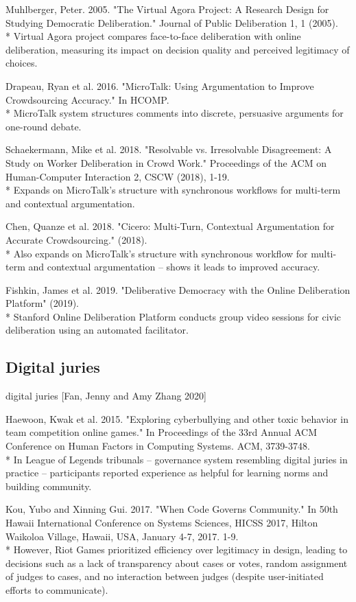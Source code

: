 \documentclass[class=book, crop=false]{standalone}
\begin{document}
Muhlberger, Peter. 2005. "The Virtual Agora Project: A Research Design for Studying Democratic Deliberation." Journal of Public Deliberation 1, 1 (2005).\\
 * Virtual Agora project compares face-to-face deliberation with online deliberation, measuring its impact on decision quality and perceived legitimacy of choices.

Drapeau, Ryan et al. 2016. "MicroTalk: Using Argumentation to Improve Crowdsourcing Accuracy." In HCOMP.\\
 * MicroTalk system structures comments into discrete, persuasive arguments for one-round debate.

Schaekermann, Mike et al. 2018. "Resolvable vs. Irresolvable Disagreement: A Study on Worker Deliberation in Crowd Work." Proceedings of the ACM on Human-Computer Interaction 2, CSCW (2018), 1-19.\\
 * Expands on MicroTalk's structure with synchronous workflows for multi-term and contextual argumentation.

Chen, Quanze et al. 2018. "Cicero: Multi-Turn, Contextual Argumentation for Accurate Crowdsourcing." (2018).\\
 * Also expands on MicroTalk's structure with synchronous workflow for multi-term and contextual argumentation -- shows it leads to improved accuracy.

Fishkin, James et al. 2019. "Deliberative Democracy with the Online Deliberation Platform" (2019).\\
 * Stanford Online Deliberation Platform conducts group video sessions for civic deliberation using an automated facilitator.

\subsection{Digital juries}

digital juries [Fan, Jenny and Amy Zhang 2020]

Haewoon, Kwak et al. 2015. "Exploring cyberbullying and other toxic behavior in team competition online games." In Proceedings of the 33rd Annual ACM Conference on Human Factors in Computing Systems. ACM, 3739-3748.\\
 * In League of Legends tribunals -- governance system resembling digital juries in practice -- participants reported experience as helpful for learning norms and building community.

Kou, Yubo and Xinning Gui. 2017. "When Code Governs Community." In 50th Hawaii International Conference on Systems Sciences, HICSS 2017, Hilton Waikoloa Village, Hawaii, USA, January 4-7, 2017. 1-9.\\
 * However, Riot Games prioritized efficiency over legitimacy in design, leading to decisions such as a lack of transparency about cases or votes, random assignment of judges to cases, and no interaction between judges (despite user-initiated efforts to communicate).
\end{document}
